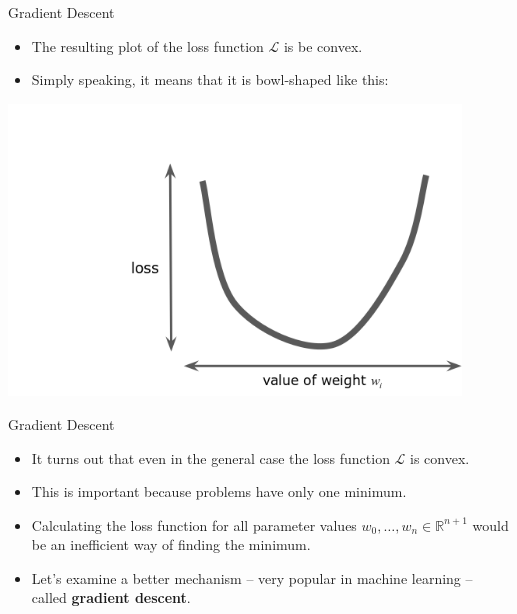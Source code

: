 \documentclass{beamer}
\begin{document}
\begin{frame}{Gradient Descent}
\begin{itemize}
\item The resulting plot of the loss function $\mathcal{L}$ is be convex. 

\medskip
\item Simply speaking, it means that it is bowl-shaped like this:
\end{itemize}

\includegraphics[width=0.9\textwidth]{images/convex.png}
\end{frame}


\begin{frame}{Gradient Descent}
\begin{itemize}
\item It turns out that even in the general case the loss function $\mathcal{L}$ is convex.

\medskip
\item This is important because problems have only one minimum.

\medskip    
\item Calculating the loss function for all parameter values $w_0,\ldots,w_n\in\mathbb{R}^{n+1}$ would be an inefficient way of finding the minimum.

\medskip    
\item Let's examine a better mechanism -- very popular in machine learning -- called {\bf gradient descent}.
\end{itemize}
\end{frame}

\end{document}
